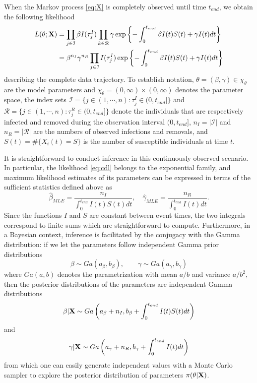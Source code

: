 \documentclass[11pt]{article}
\begin{document}
	When the Markov process \eqref{eq:X} is completely observed until time $t_{end}$, we obtain the following likelihood
	\begin{align}
		L(\theta; \mathbf{X})
		& = \prod_{j \in \mathcal{I}} \beta I(\tau^I_j) \prod_{k \in \mathcal{R}} \gamma \exp\left\lbrace - \int_{0}^{t_{end}}\beta I(t)S(t) + \gamma I(t) dt \right\rbrace  \nonumber \\
		\label{eq:cdl}
		& = \beta^{n_I} \gamma^{n_R}\prod_{j \in \mathcal{I}} I(\tau^I_j) \exp\left\lbrace - \int_{0}^{t_{end}}\beta I(t)S(t) + \gamma I(t) dt \right\rbrace
	\end{align}
	describing the complete data trajectory.
	To establish notation,
	$\theta = (\beta, \gamma) \in \chi_{\theta}$ are the model parameters 
	and $\chi_{\theta} = (0, \infty) \times (0, \infty)$ denotes the parameter space, 
	the index sets $\mathcal{I} = \{j\in (1, \cdots, n): \tau^I_j \in (0, t_{end}]\}$ and $\mathcal{R} = \{j\in (1, \cdots, n): \tau^R_j \in (0, t_{end}]\}$ denote the individuals that are respectively infected and removed during the observation interval $(0, t_{end}]$,
	$n_I = |\mathcal{I}|$ and $n_R = |\mathcal{R}|$ are the numbers of observed infections and removals,
	and	$S(t) = \#\{X_i(t) = S\}$ is the number of susceptible individuals at time $t$.
	
	It is straightforward to conduct inference in this continuously observed scenario. In particular, the likelihood \eqref{eq:cdl} belongs to the exponential family, and maximum likelihood estimates of its parameters can be expressed in terms of the sufficient statistics defined above as
	$$\hat{\beta}_{MLE} = \dfrac{n_I}{ \int_{0}^{t_{end}} I(t)S(t)dt}, \quad \hat{\gamma}_{MLE} = \dfrac{n_R}{\int_{0}^{t_{end}} I(t)dt}.$$
	Since the functions $I$ and $S$ are constant between event times, the two integrals correspond to finite sums which are straightforward to compute.
	Furthermore, in a Bayesian context, inference is facilitated by the conjugacy with the Gamma distribution: if we let the parameters follow independent Gamma prior distributions
	\begin{equation}
		\label{eq:pri}
		\beta \sim Ga(a_{\beta}, b_{\beta}), \qquad \gamma \sim Ga(a_{\gamma}, b_{\gamma})
	\end{equation}
	where $Ga(a,b)$ denotes the parametrization with mean $a/b$ and variance $a/b^2$, then the posterior distributions of the parameters are independent Gamma distributions
	\begin{equation}
		\label{eq:pdb}
		\beta | \mathbf{X} \sim Ga\left( a_{\beta} + n_I, b_{\beta} + \int_{0}^{t_{end}} I(t)S(t) dt\right)
	\end{equation}
	and
	\begin{equation}
		\label{eq:pdg}
		\gamma | \mathbf{X} \sim Ga\left( a_{\gamma} + n_R, b_{\gamma} + \int_{0}^{t_{end}} I(t) dt\right)
	\end{equation}
	from which one can easily generate independent values with a Monte Carlo sampler to explore the posterior distribution of parameters $\pi(\theta|\mathbf{X})$.
	
\end{document}
